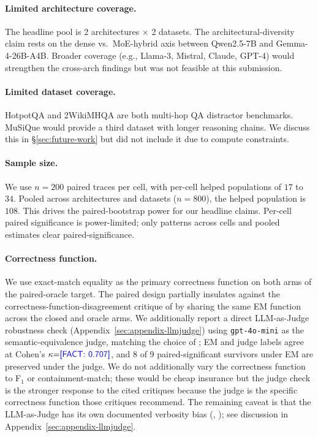 \documentclass[11pt]{article}
\newcommand{\FACT}[1]{{\color{blue}\textsf{[FACT: #1]}}}
\begin{document}
\paragraph{Limited architecture coverage.} The headline pool is 2
architectures $\times$ 2 datasets. The architectural-diversity claim rests
on the dense vs.\ MoE-hybrid axis between Qwen2.5-7B and Gemma-4-26B-A4B.
Broader coverage (e.g., Llama-3, Mistral, Claude, GPT-4) would strengthen
the cross-arch findings but was not feasible at this submission.

\paragraph{Limited dataset coverage.} HotpotQA and 2WikiMHQA are both
multi-hop QA distractor benchmarks. MuSiQue \citep{Trivedi_MuSiQue} would
provide a third dataset with longer reasoning chains. We discuss this in
\S\ref{sec:future-work} but did not include it due to compute constraints.

\paragraph{Sample size.} We use $n{=}200$ paired traces per cell, with
per-cell helped populations of $17$ to $34$. Pooled across architectures and
datasets ($n{=}800$), the helped population is $108$. This drives the
paired-bootstrap power for our headline claims. Per-cell paired significance
is power-limited; only patterns across cells and pooled estimates clear
paired-significance.

\paragraph{Correctness function.} We use exact-match equality as the
primary correctness function on both arms of the paired-oracle target.
The paired design partially insulates against the
correctness-function-disagreement critique of
\cite{Ielanskyi_PitfallsUQEvaluationNLG} by sharing the same EM
function across the closed and oracle arms. We additionally report a
direct LLM-as-Judge robustness check
(Appendix~\ref{sec:appendix-llmjudge}) using
\texttt{gpt-4o-mini} as the semantic-equivalence judge, matching the
choice of \citet{Janiak_IllusionProgressHallucinationDetection}; EM and
judge labels agree at Cohen's $\kappa{=}\FACT{0.707}$, and $8$ of $9$
paired-significant survivors under EM are preserved under the judge. We
do not additionally vary the correctness function to F$_1$ or
containment-match; these would be cheap insurance but the judge check is
the stronger response to the cited critiques because the judge is the
specific correctness function those critiques recommend. The remaining
caveat is that the LLM-as-Judge has its own documented verbosity bias
(\citealp{Zheng_LLMasaJudge}, \citealp{Wang_NotFairEvaluators}); see
discussion in Appendix~\ref{sec:appendix-llmjudge}.
\end{document}
